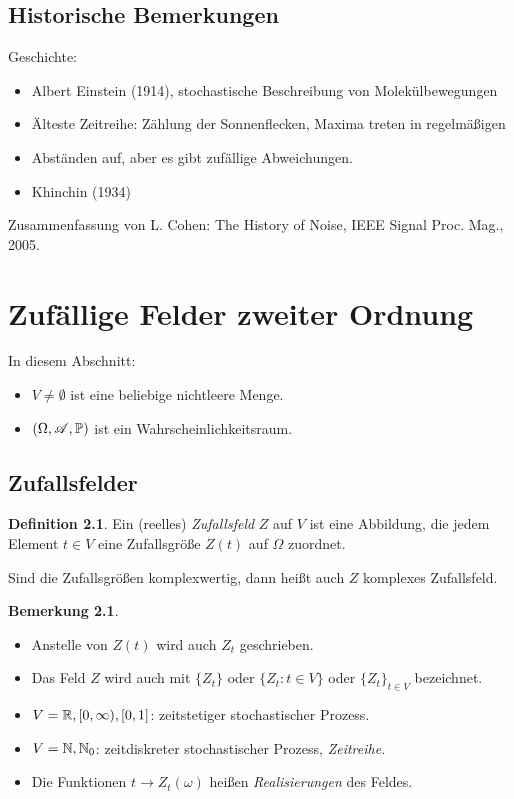 \documentclass[
 a4paper,
 12pt,
 parskip=half
 ]{scrreprt}
\theoremstyle{plain}
\theoremstyle{definition}
\newtheorem{defn}[thm]{Definition}
\newtheorem*{rmrk*}{Bemerkung}
\numberwithin{equation}{section}
\begin{document}
\section{Historische Bemerkungen}
Geschichte:
\begin{itemize}
\item Albert Einstein (1914), stochastische Beschreibung von Molekülbewegungen
\item Älteste Zeitreihe: Zählung der Sonnenflecken, Maxima treten in regelmäßigen
\item Abständen auf, aber es gibt zufällige Abweichungen.
\item Khinchin (1934)
\end{itemize}
Zusammenfassung von L. Cohen: The History of Noise, IEEE Signal Proc. Mag.,
2005.

\chapter{Zufällige Felder zweiter Ordnung}
In diesem Abschnitt:
\begin{itemize}
\item $V \ne \emptyset$ ist eine beliebige nichtleere Menge.
\item $(\Omega, \mathscr{A}, \mathbb{P})$ ist ein Wahrscheinlichkeitsraum.
\end{itemize}

\section{Zufallsfelder}
\begin{defn}
  Ein (reelles) \emph{Zufallsfeld} $Z$ auf $V$ ist eine Abbildung, die jedem
  Element $t \in V$ eine Zufallsgröße $Z(t)$ auf $\Omega$ zuordnet.

  Sind die Zufallsgrößen komplexwertig, dann heißt auch $Z$ komplexes
  Zufallsfeld.
\end{defn}

\begin{rmrk*}
  \begin{itemize}
  \item Anstelle von $Z(t)$ wird auch $Z_t$ geschrieben.
  \item Das Feld $Z$ wird auch mit $\{ Z_t \}$ oder $\{ Z_t : t \in V \}$ oder
    $\{ Z_t \}_{t \in V}$ bezeichnet.
  \item $V = \mathbb{R}, [0, \infty),[0,1]$: zeitstetiger stochastischer Prozess.
  \item $V = \mathbb{N}, \mathbb{N}_0$: zeitdiskreter stochastischer Prozess,
    \emph{Zeitreihe}.
  \item Die Funktionen $t \to Z_t(\omega)$ heißen \emph{Realisierungen} des
    Feldes.
  \end{itemize}
\end{rmrk*}
\end{document}
